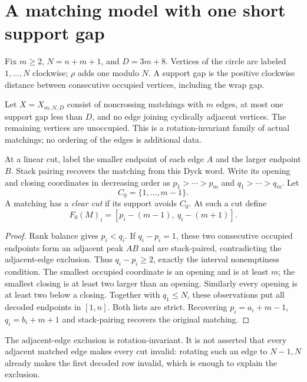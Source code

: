 \section{A matching model with one short support gap}\label{sec:matching}
Fix $m\ge2$, $N=n+m+1$, and $D=3m+8$. Vertices of the circle are labeled $1,\ldots,N$ clockwise; $\rho$ adds one modulo $N$. A support gap is the positive clockwise distance between consecutive occupied vertices, including the wrap gap.

Let $X=X_{m,N,D}$ consist of noncrossing matchings with $m$ edges, at most one support gap less than $D$, and no edge joining cyclically adjacent vertices. The remaining vertices are unoccupied. This is a rotation-invariant family of actual matchings; no ordering of the edges is additional data.

At a linear cut, label the smaller endpoint of each edge $A$ and the larger endpoint $B$. Stack pairing recovers the matching from this Dyck word. Write its opening and closing coordinates in decreasing order as $p_1>\cdots>p_m$ and $q_1>\cdots>q_m$. Let
\[
 C_0=\{1,\ldots,m-1\}.
\]
A matching has a \emph{clear cut} if its support avoids $C_0$. At such a cut define
\begin{equation}\label{eq:decoder}
 F_0(M)_i=[p_i-(m-1),\ q_i-(m+1)].
\end{equation}

\begin{proof}
Rank balance gives $p_i<q_i$. If $q_i-p_i=1$, these two consecutive occupied endpoints form an adjacent peak $AB$ and are stack-paired, contradicting the adjacent-edge exclusion. Thus $q_i-p_i\ge2$, exactly the interval nonemptiness condition. The smallest occupied coordinate is an opening and is at least $m$; the smallest closing is at least two larger than an opening. Similarly every opening is at least two below a closing. Together with $q_1\le N$, these observations put all decoded endpoints in $[1,n]$. Both lists are strict. Recovering $p_i=a_i+m-1$, $q_i=b_i+m+1$ and stack-pairing recovers the original matching.
\end{proof}

The adjacent-edge exclusion is rotation-invariant. It is not asserted that every adjacent matched edge makes every cut invalid: rotating such an edge to $N-1,N$ already makes the first decoded row invalid, which is enough to explain the exclusion.

